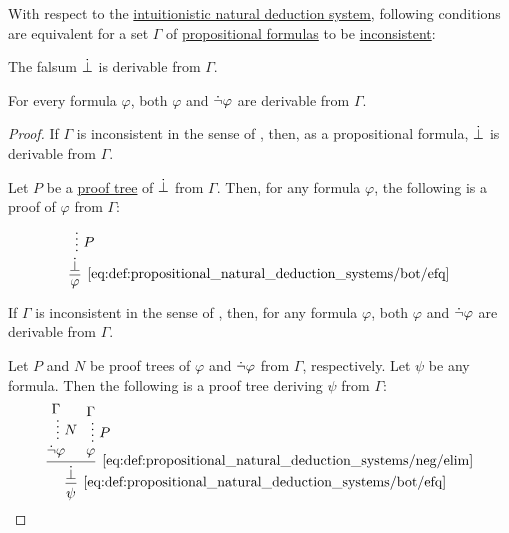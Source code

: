 \begin{proposition}\label{thm:propositional_consistent_set}
  With respect to the \hyperref[def:propositional_natural_deduction_systems]{intuitionistic natural deduction system}, following conditions are equivalent for a set \( \Gamma \) of \hyperref[def:propositional_syntax/formula]{propositional formulas} to be \hyperref[def:consistent_set_of_sentences]{inconsistent}:
  \begin{thmenum}
     The falsum \( \dot\bot \) is derivable from \( \Gamma \).

     For every formula \( \varphi \), both \( \varphi \) and \( \dot\neg \varphi \) are derivable from \( \Gamma \).
  \end{thmenum}
\end{proposition}
\begin{proof}

  \SufficiencySubProof* If \( \Gamma \) is inconsistent in the sense of , then, as a propositional formula, \( \dot\bot \) is derivable from \( \Gamma \).

  \NecessitySubProof* Let \( P \) be a \hyperref[def:natural_deduction_proof_tree]{proof tree} of \( \dot\bot \) from \( \Gamma \). Then, for any formula \( \varphi \), the following is a proof of \( \varphi \) from \( \Gamma \):
  \begin{equation*}
    \begin{prooftree}
      \hypo{}
      \ellipsis { \( P \) } { \synbot }
      \infer1[\ref{eq:def:propositional_natural_deduction_systems/bot/efq}]{ \varphi }.
    \end{prooftree}
  \end{equation*}


  \SufficiencySubProof* If \( \Gamma \) is inconsistent in the sense of , then, for any formula \( \varphi \), both \( \varphi \) and \( \dot\neg \varphi \) are derivable from \( \Gamma \).

  \NecessitySubProof* Let \( P \) and \( N \) be proof trees of \( \varphi \) and \( \dot\neg \varphi \) from \( \Gamma \), respectively. Let \( \psi \) be any formula. Then the following is a proof tree deriving \( \psi \) from \( \Gamma \):
  \begin{equation*}
    \begin{prooftree}
      \hypo{ \Gamma }
      \ellipsis { \( N \) } { \synneg \varphi }

      \hypo{ \Gamma }
      \ellipsis { \( P \) } { \varphi }

      \infer2[\ref{eq:def:propositional_natural_deduction_systems/neg/elim}]{ \synbot }.

      \infer1[\ref{eq:def:propositional_natural_deduction_systems/bot/efq}]{ \psi }.
    \end{prooftree}
  \end{equation*}
\end{proof}

